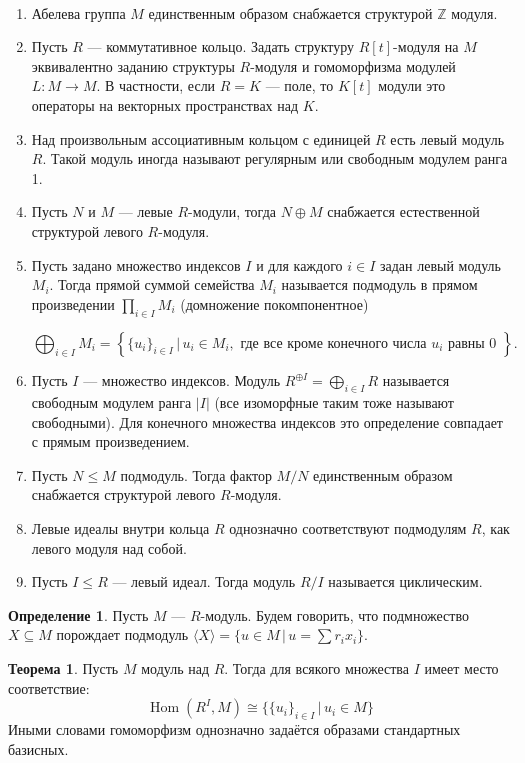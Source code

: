 \documentclass[10pt,a4paper,oneside]{book}
\theoremstyle{definition}
\newtheorem{defn}{Определение}
\newtheorem{thm}{Теорема}
\newcommand{\mb}[1]{\mathbb{#1}}
\newcommand{\Hom}{\operatorname{Hom}}
\def\exm{\noindent {\bf Примеры:}}
\def\enm{\begin{enumerate}}
\def\eenm{\end{enumerate}}
\begin{document}
\exm\\
\enm
\item Абелева группа $M$  единственным образом снабжается структурой $\mb Z$ модуля. 
\item Пусть $R$ --- коммутативное кольцо. Задать структуру $R[t]$-модуля на $M$   эквивалентно заданию структуры $R$-модуля и гомоморфизма модулей $L\colon M \to M$. В частности, если $R=K$ --- поле, то $K[t]$ модули это операторы на векторных пространствах над $K$.
\item Над произвольным ассоциативным кольцом с единицей $R$ есть левый модуль $R$. Такой модуль иногда называют регулярным или свободным модулем ранга 1.
\item Пусть $N$ и $M$ --- левые $R$-модули, тогда $N\oplus M$ снабжается естественной структурой левого $R$-модуля.
\item Пусть задано множество индексов $I$ и для каждого $i\in I$  задан левый модуль $M_i$. Тогда прямой суммой семейства $M_i$ называется подмодуль в прямом произведении $\prod_{i\in I} M_i$ (домножение покомпонентное)

$$\bigoplus_{i\in I} M_i = \left\{\{u_i\}_{i\in I} \,|\,  u_i \in M_i,  \text{ где все кроме конечного числа $u_i$ равны 0  } \right\}.$$
\item Пусть $I$ --- множество индексов. Модуль $R^{\oplus I}= \bigoplus_{i\in I} R$ называется свободным модулем ранга $|I|$ (все изоморфные таким тоже называют свободными). Для конечного множества индексов это определение совпадает с прямым произведением.
\item Пусть $N\leq M$ подмодуль. Тогда фактор $M/N$ единственным образом снабжается структурой левого $R$-модуля.
\item Левые идеалы  внутри кольца $R$ однозначно соответствуют подмодулям $R$, как левого модуля над собой.
\item Пусть $I\leq R$ --- левый идеал. Тогда модуль $R/I$ называется циклическим.
\eenm




\begin{defn}
Пусть $M$ --- $R$-модуль. Будем говорить, что подмножество $X\subseteq M$ порождает подмодуль $\langle X \rangle=\{u\in M \,|\, u=\sum r_ix_i\}$.
\end{defn}


\begin{thm} Пусть $M$ модуль над $R$. Тогда для всякого множества $I$ имеет место  соответствие:
$$\Hom(R^I,M)\cong \{ \{u_i\}_{i\in I} \,|\, u_i\in M  \}$$
Иными словами гомоморфизм однозначно задаётся образами стандартных базисных.
\end{thm}
\end{document}
